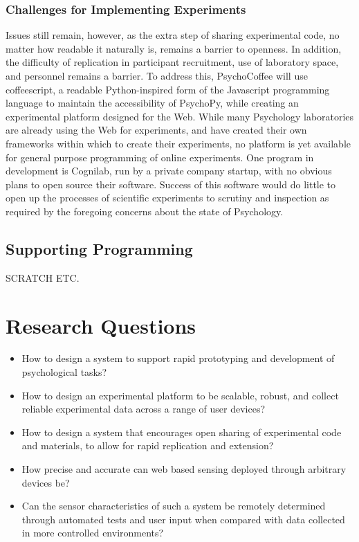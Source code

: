\documentclass[12pt,a4paper,titlepage]{scrreprt}
\begin{document}
\subsection{Challenges for Implementing Experiments}
Issues still remain, however, as the extra step of sharing experimental code, no matter how readable it naturally is, remains a barrier to openness. In addition, the difficulty of replication in participant recruitment, use of laboratory space, and personnel remains a barrier. To address this, PsychoCoffee will use coffeescript, a readable Python-inspired form of the Javascript programming language to maintain the accessibility of PsychoPy, while creating an experimental platform designed for the Web.
While many Psychology laboratories are already using the Web for experiments, and have created their own frameworks within which to create their experiments\cite{krantz_comparing_1997}\cite{germine_is_2012}, no platform is yet available for general purpose programming of online experiments. One program in development is Cognilab\cite{_cognilab_????}, run by a private company startup, with no obvious plans to open source their software. Success of this software would do little to open up the processes of scientific experiments to scrutiny and inspection as required by the foregoing concerns about the state of Psychology.
\section{Supporting Programming}
SCRATCH ETC.
\chapter{Research Questions}
\begin{itemize}
\item How to design a system to support rapid prototyping and development of psychological tasks?
\item How to design an experimental platform to be scalable, robust, and collect reliable experimental data across a range of user devices?
\item How to design a system that encourages open sharing of experimental code and materials, to allow for rapid replication and extension?
\item How precise and accurate can web based sensing deployed through arbitrary devices be?
\item Can the sensor characteristics of such a system be remotely determined through automated tests and user input when compared with data collected in more controlled environments?
\end{itemize}
\end{document}
